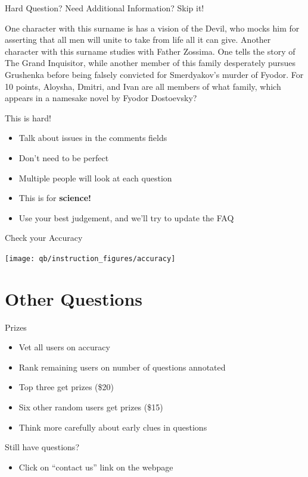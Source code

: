 \documentclass[compress]{beamer}
\begin{document}
\begin{frame}{Hard Question? Need Additional Information?  Skip it!}

One character with this surname is has a vision of the Devil, who mocks him for asserting that all men will unite to take from life all it can give. Another character with this surname studies with Father Zossima. One tells the story of The Grand Inquisitor, while \alert<2>{another member of this family desperately} pursues Grushenka before being falsely convicted for Smerdyakov's murder of Fyodor. For 10 points, Aloysha, Dmitri, and Ivan are all members of what family, which appears in a namesake novel by Fyodor Dostoevsky?

\end{frame}


\begin{frame}{This is hard!}

	\begin{itemize}
		\item Talk about issues in the comments fields
		\item Don't need to be perfect
		\item Multiple people will look at each question
		\item This is for {\bf science!}
		\pause
		\item Use your best judgement, and we'll try to update the FAQ
	\end{itemize}

\end{frame}


\begin{frame}{Check your Accuracy}

\texttt{[image: qb/instruction\_figures/accuracy]}

\end{frame}

\section{Other Questions}


\begin{frame}{Prizes}

  \begin{itemize}
    \item Vet all users on accuracy
    \item Rank remaining users on number of questions annotated
    \item Top three get prizes (\$20)
    \item Six other random users get prizes (\$15)
    \pause
    \item Think more carefully about early clues in questions
  \end{itemize}

\end{frame}

\begin{frame}{Still have questions?}
  \begin{itemize}
    \item Click on ``contact us'' link on the webpage
  \end{itemize}
\end{frame}
\end{document}
